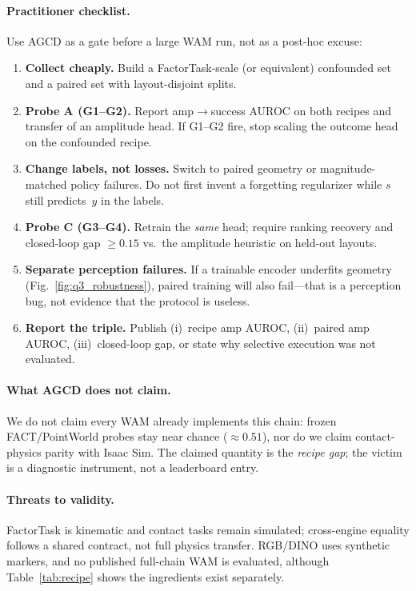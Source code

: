 \documentclass[conference]{IEEEtran}
\begin{document}
\paragraph{Practitioner checklist.}
Use AGCD as a gate before a large WAM run, not as a post-hoc excuse:
\begin{enumerate}
\item \textbf{Collect cheaply.} Build a FactorTask-scale (or equivalent)
confounded set and a paired set with layout-disjoint splits.
\item \textbf{Probe A (G1--G2).} Report amp$\rightarrow$success AUROC on both
recipes and transfer of an amplitude head. If G1--G2 fire, stop scaling the
outcome head on the confounded recipe.
\item \textbf{Change labels, not losses.} Switch to paired geometry or
magnitude-matched policy failures. Do not first invent a forgetting regularizer
while $s$ still predicts~$y$ in the labels.
\item \textbf{Probe C (G3--G4).} Retrain the \emph{same} head; require ranking
recovery and closed-loop gap $\ge 0.15$ vs.\ the amplitude heuristic on held-out
layouts.
\item \textbf{Separate perception failures.} If a trainable encoder underfits
geometry (Fig.~\ref{fig:q3_robustness}), paired training will also fail---that is a
perception bug, not evidence that the protocol is useless.
\item \textbf{Report the triple.} Publish (i)~recipe amp AUROC, (ii)~paired amp
AUROC, (iii)~closed-loop gap, or state why selective execution was not evaluated.
\end{enumerate}

\paragraph{What AGCD does not claim.}
We do not claim every WAM already implements this chain: frozen FACT/PointWorld
probes stay near chance ($\approx0.51$), nor do we claim contact-physics parity
with Isaac Sim. The claimed quantity is the \emph{recipe gap}; the victim is a
diagnostic instrument, not a leaderboard entry.

\paragraph{Threats to validity.}
FactorTask is kinematic and contact tasks remain simulated; cross-engine equality
follows a shared contract, not full physics transfer. RGB/DINO uses synthetic
markers, and no published full-chain WAM is evaluated, although
Table~\ref{tab:recipe} shows the ingredients exist separately.
\end{document}

